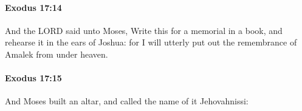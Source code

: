 		\paragraph{Exodus 17:14} %
			\label{EXODUS-17-14}

			And the LORD said unto Moses, Write this for a memorial in a book, and rehearse it in the ears of Joshua: for I will utterly put out the remembrance of Amalek from under heaven.


		\paragraph{Exodus 17:15} %
			\label{EXODUS-17-15}

			And Moses built an altar, and called the name of it Jehovahnissi:


